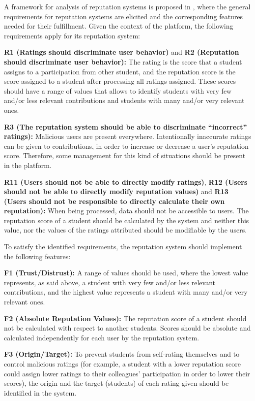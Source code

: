 \documentclass{llncs}
\begin{document}
A framework for analysis of reputation systems is proposed in \cite{vavilis2014reference}, where the general requirements for reputation systems are elicited and the corresponding features needed for their fulfillment. Given the context of the platform, the following requirements apply for its reputation system:

\textbf{R1 (Ratings should discriminate user behavior)} and \textbf{R2 (Reputation should discriminate user behavior): } The rating is the score that a student assigns to a participation from other student, and the reputation score is the score assigned to a student after processing all ratings assigned. These scores should have a range of values that allows to identify students with very few and/or less relevant contributions and students with many and/or very relevant ones.

\textbf{R3 (The reputation system should be able to discriminate ``incorrect'' ratings): } Malicious users are present everywhere. Intentionally inaccurate ratings can be given to contributions, in order to increase or decrease a user's reputation score. Therefore, some management for this kind of situations should be present in the platform.

\textbf{R11 (Users should not be able to directly modify ratings)}, \textbf{R12 (Users should not be able to directly modify reputation values)} and \textbf{R13 (Users should not be responsible to directly calculate their own reputation): } When being processed, data should not be accessible to users. The reputation score of a student should be calculated by the system and neither this value, nor the values of the ratings attributed should be modifiable by the users.

To satisfy the identified requirements, the reputation system should implement the following features:

\textbf{F1 (Trust/Distrust):} A range of values should be used, where the lowest value represents, as said above, a student with very few and/or less relevant contributions, and the highest value represents a student with many and/or very relevant ones. 

\textbf{F2 (Absolute Reputation Values):} The reputation score of a student should not be calculated with respect to another students. Scores should be absolute and calculated independently for each user by the reputation system.

\textbf{F3 (Origin/Target):} To prevent students from self-rating themselves and to control malicious ratings (for example, a student with a lower reputation score could assign lower ratings to their colleagues' participation in order to lower their scores), the origin and the target (students) of each rating given should be identified in the system.
\end{document}
